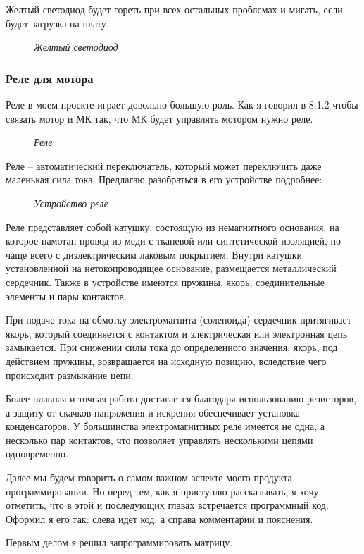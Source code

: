\documentclass[a4paper, 12pt]{article}
\newcommand{\image}[3]{
	\begin{figure}[ht]
		\center{\texttt{[image: img/\#1]} }
		\caption{\textit{#3}}\end{figure}
}
\begin{document}
Желтый светодиод будет гореть при всех остальных проблемах и мигать, если будет
загрузка на плату.

\image{Желтый.jpg}{150}{Желтый светодиод}
\newpage

\subsubsection{Реле для мотора}

Реле в моем проекте играет довольно большую роль. Как я говорил в 8.1.2
чтобы связать мотор и МК так, что МК будет управлять мотором нужно реле.

\image{Реле.jpg}{200}{Реле}

Реле -- автоматический переключатель, который может переключить даже маленькая
сила тока. Предлагаю разобраться в его устройстве подробнее:

\image{реле устройство.jpg}{200}{Устройство реле}

Реле представляет собой катушку, состоящую из немагнитного основания, на
которое намотан провод из меди с тканевой или синтетической изоляцией, но чаще
всего с диэлектрическим лаковым покрытием. Внутри катушки установленной на
нетокопроводящее основание, размещается металлический сердечник. Также в
устройстве имеются пружины, якорь, соединительные элементы и пары контактов.

При подаче тока на обмотку электромагнита (соленоида) сердечник притягивает
якорь, который соединяется с контактом и электрическая или электронная цепь
замыкается. При снижении силы тока до определенного значения, якорь, под
действием пружины, возвращается на исходную позицию, вследствие чего
происходит размыкание цепи.

Более плавная и точная работа достигается благодаря использованию резисторов,
а защиту от скачков напряжения и искрения обеспечивает установка конденсаторов.
У большинства электромагнитных реле имеется не одна, а несколько пар
контактов, что позволяет управлять несколькими цепями одновременно.

Далее мы будем говорить о самом важном аспекте моего продукта --
программировании. Но перед тем, как я приступлю рассказывать, я хочу отметить,
что в этой и последующих главах встречается программный код. Оформил я его так:
слева идет код, а справа комментарии и пояснения.

Первым делом я решил запрограммировать матрицу.\newpage
\end{document}
